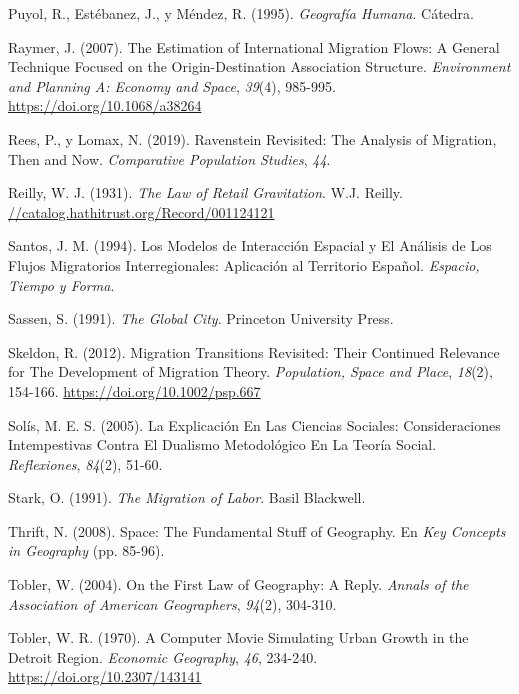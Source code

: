 \documentclass[12pt,spanish,]{article}
\begin{document}
\leavevmode\hypertarget{ref-puyol1995}{}%
Puyol, R., Estébanez, J., y Méndez, R. (1995). \emph{Geografía Humana}.
Cátedra.

\leavevmode\hypertarget{ref-raymer2007}{}%
Raymer, J. (2007). The Estimation of International Migration Flows: A
General Technique Focused on the Origin-Destination Association
Structure. \emph{Environment and Planning A: Economy and Space},
\emph{39}(4), 985-995. \url{https://doi.org/10.1068/a38264}

\leavevmode\hypertarget{ref-rees2019}{}%
Rees, P., y Lomax, N. (2019). Ravenstein Revisited: The Analysis of
Migration, Then and Now. \emph{Comparative Population Studies},
\emph{44}.

\leavevmode\hypertarget{ref-reilly1931}{}%
Reilly, W. J. (1931). \emph{The Law of Retail Gravitation}. W.J. Reilly.
\url{//catalog.hathitrust.org/Record/001124121}

\leavevmode\hypertarget{ref-santos1994}{}%
Santos, J. M. (1994). Los Modelos de Interacción Espacial y El Análisis
de Los Flujos Migratorios Interregionales: Aplicación al Territorio
Español. \emph{Espacio, Tiempo y Forma}.

\leavevmode\hypertarget{ref-sassen1991}{}%
Sassen, S. (1991). \emph{The Global City}. Princeton University Press.

\leavevmode\hypertarget{ref-skeldon2012}{}%
Skeldon, R. (2012). Migration Transitions Revisited: Their Continued
Relevance for The Development of Migration Theory. \emph{Population,
Space and Place}, \emph{18}(2), 154-166.
\url{https://doi.org/10.1002/psp.667}

\leavevmode\hypertarget{ref-solis2005}{}%
Solís, M. E. S. (2005). La Explicación En Las Ciencias Sociales:
Consideraciones Intempestivas Contra El Dualismo Metodológico En La
Teoría Social. \emph{Reflexiones}, \emph{84}(2), 51-60.

\leavevmode\hypertarget{ref-stark1991}{}%
Stark, O. (1991). \emph{The Migration of Labor}. Basil Blackwell.

\leavevmode\hypertarget{ref-thrift2008}{}%
Thrift, N. (2008). Space: The Fundamental Stuff of Geography. En
\emph{Key Concepts in Geography} (pp. 85-96).

\leavevmode\hypertarget{ref-tobler2004}{}%
Tobler, W. (2004). On the First Law of Geography: A Reply. \emph{Annals
of the Association of American Geographers}, \emph{94}(2), 304-310.

\leavevmode\hypertarget{ref-tobler1970}{}%
Tobler, W. R. (1970). A Computer Movie Simulating Urban Growth in the
Detroit Region. \emph{Economic Geography}, \emph{46}, 234-240.
\url{https://doi.org/10.2307/143141}
\end{document}
